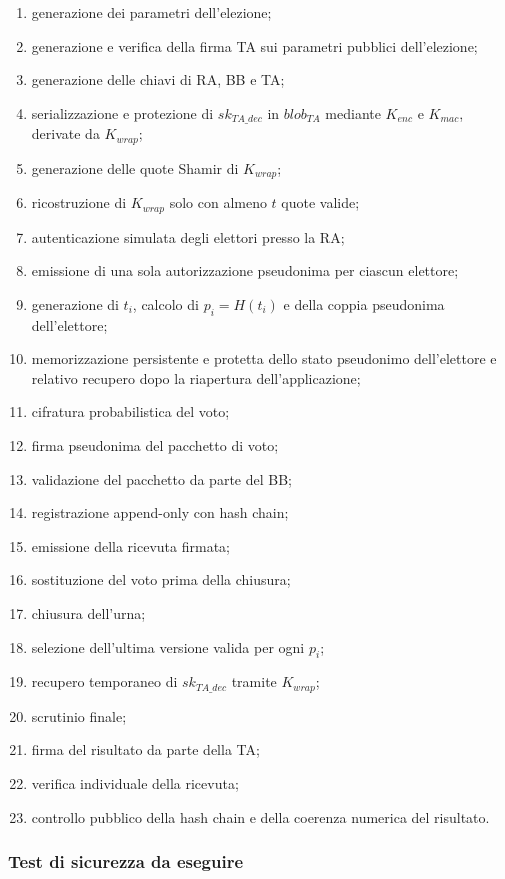 \documentclass[12pt,a4paper]{article}
\newcommand{\sk}{\mathit{sk}}
\begin{document}
\begin{enumerate}
\item generazione dei parametri dell'elezione;
\item generazione e verifica della firma TA sui parametri pubblici dell'elezione;
\item generazione delle chiavi di RA, BB e TA;
\item serializzazione e protezione di $\sk_{\mathit{TA\_dec}}$
in $\mathit{blob}_{\mathit{TA}}$ mediante
$K_{\mathit{enc}}$ e $K_{\mathit{mac}}$, derivate da
$K_{\mathit{wrap}}$;
\item generazione delle quote Shamir di $K_{\mathit{wrap}}$;
\item ricostruzione di $K_{\mathit{wrap}}$ solo con almeno $t$ quote valide;
\item autenticazione simulata degli elettori presso la RA;
\item emissione di una sola autorizzazione pseudonima per ciascun elettore;
\item generazione di $t_i$, calcolo di $p_i = H(t_i)$ e della coppia pseudonima dell'elettore;
\item memorizzazione persistente e protetta dello stato pseudonimo dell’elettore e relativo recupero dopo la riapertura dell’applicazione;
\item cifratura probabilistica del voto;
\item firma pseudonima del pacchetto di voto;
\item validazione del pacchetto da parte del BB;
\item registrazione append-only con hash chain;
\item emissione della ricevuta firmata;
\item sostituzione del voto prima della chiusura;
\item chiusura dell'urna;
\item selezione dell'ultima versione valida per ogni $p_i$;
\item recupero temporaneo di $\sk_{\mathit{TA\_dec}}$ tramite $K_{\mathit{wrap}}$;
\item scrutinio finale;
\item firma del risultato da parte della TA;
\item verifica individuale della ricevuta;
\item controllo pubblico della hash chain e della coerenza numerica del risultato.
\end{enumerate}

\subsubsection*{Test di sicurezza da eseguire}
\end{document}

